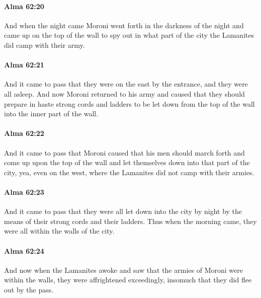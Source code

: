 		\paragraph{Alma 62:20} %
			\label{ALMA-62-20}

			And when the night came Moroni went forth in the darkness of the night
			and came up on the top of the wall
			to spy out in what part of the city the Lamanites did camp with their army.

		\paragraph{Alma 62:21} %
			\label{ALMA-62-21}

			And it came to pass that they were on the east by the entrance,
			and they were all asleep.
			And now Moroni returned to his army
			and caused that they should prepare in haste strong cords and ladders
			to be let down from the top of the wall into the inner part of the wall.

		\paragraph{Alma 62:22} %
			\label{ALMA-62-22}

			And it came to pass that Moroni caused
			that his men should march forth
			and come up upon the top of the wall
			and let themselves down into that part of the city,
			yea, even on the west, where the Lamanites did not camp with their armies.

		\paragraph{Alma 62:23} %
			\label{ALMA-62-23}

			And it came to pass that they were all let down into the city by night
			by the means of their strong cords and their ladders.
			Thus when the morning came, they were all within the walls of the city.

		\paragraph{Alma 62:24} %
			\label{ALMA-62-24}

			And now when the Lamanites awoke
			and saw that the armies of Moroni were within the walls,
			they were affrightened exceedingly,
			insomuch that they did flee out by the pass.

